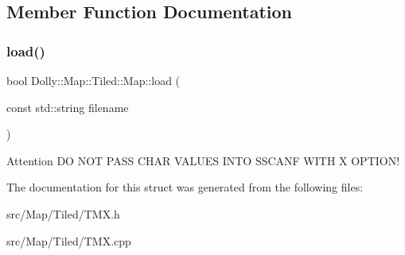\subsection{Member Function Documentation}
\mbox{\label{struct_dolly_1_1_map_1_1_tiled_1_1_map_aa0abfd16a653562bd644696cd6645db4}} 
\subsubsection{\texorpdfstring{load()}{load()}}
{\footnotesize\ttfamily bool Dolly\+::\+Map\+::\+Tiled\+::\+Map\+::load (\begin{DoxyParamCaption}\item[{const std\+::string}]{filename }\end{DoxyParamCaption})}

\begin{DoxyAttention}{Attention}
DO N\+OT P\+A\+SS C\+H\+AR V\+A\+L\+U\+ES I\+N\+TO S\+S\+C\+A\+NF W\+I\+TH X O\+P\+T\+I\+O\+N! 
\end{DoxyAttention}


The documentation for this struct was generated from the following files\+:\begin{DoxyCompactItemize}
\item 
src/\+Map/\+Tiled/T\+M\+X.\+h\item 
src/\+Map/\+Tiled/T\+M\+X.\+cpp\end{DoxyCompactItemize}
